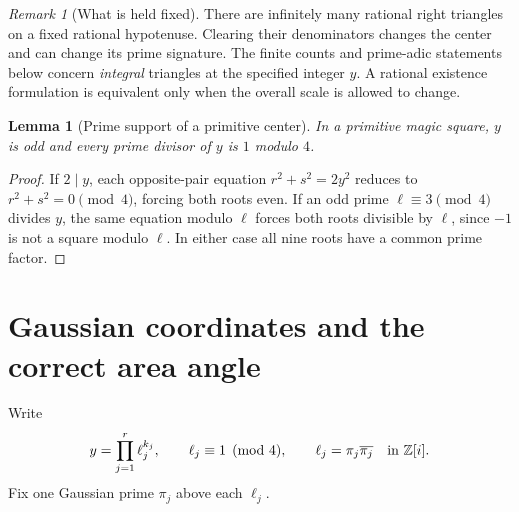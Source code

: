 \documentclass[11pt]{article}
\newtheorem{lemma}[theorem]{Lemma}
\theoremstyle{definition}\newtheorem{definition}[theorem]{Definition}
\theoremstyle{remark}\newtheorem{remark}[theorem]{Remark}
\begin{document}
\begin{remark}[What is held fixed]
There are infinitely many rational right triangles on a fixed rational hypotenuse. Clearing their denominators changes the center and can change its prime signature. The finite counts and prime-adic statements below concern \emph{integral} triangles at the specified integer $y$. A rational existence formulation is equivalent only when the overall scale is allowed to change.
\end{remark}

\begin{lemma}[Prime support of a primitive center]\label{lem:support}
In a primitive magic square, $y$ is odd and every prime divisor of $y$ is $1$ modulo $4$.
\end{lemma}
\begin{proof}
If $2\mid y$, each opposite-pair equation $r^2+s^2=2y^2$ reduces to $r^2+s^2=0\pmod4$, forcing both roots even. If an odd prime $\ell\equiv3\pmod4$ divides $y$, the same equation modulo $\ell$ forces both roots divisible by $\ell$, since $-1$ is not a square modulo $\ell$. In either case all nine roots have a common prime factor.
\end{proof}

\section{Gaussian coordinates and the correct area angle}\label{sec:gaussian}
Write
\[
y=\prod_{j=1}^r\ell_j^{k_j},\qquad \ell_j\equiv1\pmod4,
\qquad \ell_j=\pi_j\overline{\pi_j}\quad\text{in }\mathbb Z[i].
\]
Fix one Gaussian prime $\pi_j$ above each $\ell_j$.
\end{document}
